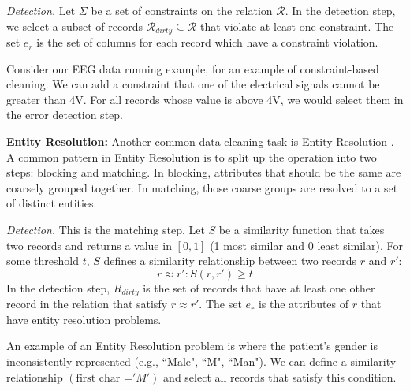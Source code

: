 \vspace{0.5em}

\emph{Detection. } Let $\Sigma$ be a set of constraints on the relation $\mathcal{R}$. 
In the detection step, we select a subset of records $\mathcal{R}_{dirty} \subseteq \mathcal{R}$ that violate at least one constraint.
The set $e_r$ is the set of columns for each record which have a constraint violation. 

\begin{example}
Consider our EEG data running example, for an example of constraint-based cleaning.
We can add a constraint that one of the electrical signals cannot be greater than 4V.
For all records whose value is above 4V, we would select them in the error detection step.
\end{example}

\vspace{0.5em}

\noindent\textbf{Entity Resolution: }
Another common data cleaning task is Entity Resolution \cite{gokhale2014corleone, DBLP:journals/pvldb/KopckeTR10, wang2012crowder}.
A common pattern in Entity Resolution is to split up the operation into two steps: blocking and matching.
In blocking, attributes that should be the same are coarsely grouped together.
In matching, those coarse groups are resolved to a set of distinct entities.

\vspace{0.5em}

\emph{Detection. } This is the matching step. Let $S$ be a similarity function that takes two records and returns a value in $[0,1]$ (1 most similar and 0 least similar). For some threshold $t$, $S$ defines a similarity relationship between two records $r$ and $r'$:
\[
r \approx r' : S(r,r') \ge t
\] 
In the detection step, $R_{dirty}$ is the set of records that have at least one other record in the relation that satisfy $r \approx r'$.
The set $e_r$ is the attributes of $r$ that have entity resolution problems.

\begin{example}
An example of an Entity Resolution problem is where the patient's gender is inconsistently represented (e.g., ``Male", ``M", ``Man"). 
We can define a similarity relationship $(\text{first char =} 'M')$ and select all records that satisfy this condition.
\end{example}

